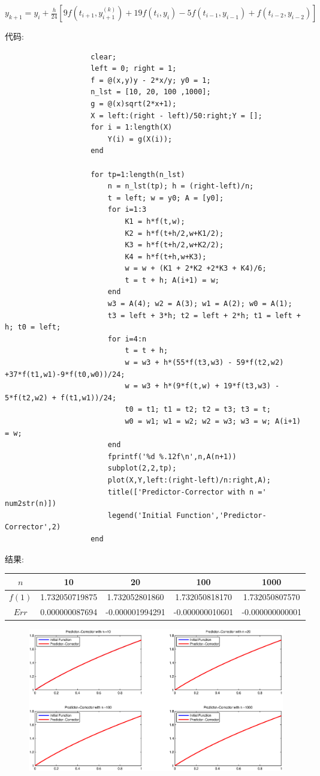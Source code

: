 \documentclass{article}
\begin{document}
\begin{CJK*}{UTF8}{song}
\begin{enumerate}
						$y_{k+1} = y_i + \frac{h}{24}\left[9f\left(t_{i+1},y_{i+1}^{\left(k\right)}\right) + 19f\left(t_i,y_i\right) -5f\left(t_{i-1},y_{i-1}\right) + f\left(t_{i-2},y_{i-2}\right)\right]$
					\end{enumerate}
					代码:
					\begin{lstlisting}
					clear;
					left = 0; right = 1;
					f = @(x,y)y - 2*x/y; y0 = 1;
					n_lst = [10, 20, 100 ,1000];
					g = @(x)sqrt(2*x+1);
					X = left:(right - left)/50:right;Y = [];
					for i = 1:length(X)
						Y(i) = g(X(i));
					end
						
					for tp=1:length(n_lst)
						n = n_lst(tp); h = (right-left)/n;
						t = left; w = y0; A = [y0];
						for i=1:3
							K1 = h*f(t,w);
							K2 = h*f(t+h/2,w+K1/2);
							K3 = h*f(t+h/2,w+K2/2);
							K4 = h*f(t+h,w+K3);
							w = w + (K1 + 2*K2 +2*K3 + K4)/6;
							t = t + h; A(i+1) = w;
						end
						w3 = A(4); w2 = A(3); w1 = A(2); w0 = A(1);
						t3 = left + 3*h; t2 = left + 2*h; t1 = left + h; t0 = left;
						for i=4:n
							t = t + h;
							w = w3 + h*(55*f(t3,w3) - 59*f(t2,w2) +37*f(t1,w1)-9*f(t0,w0))/24;
							w = w3 + h*(9*f(t,w) + 19*f(t3,w3) - 5*f(t2,w2) + f(t1,w1))/24;
							t0 = t1; t1 = t2; t2 = t3; t3 = t;
							w0 = w1; w1 = w2; w2 = w3; w3 = w; A(i+1) = w;
						end
						fprintf('%d %.12f\n',n,A(n+1))
						subplot(2,2,tp);
						plot(X,Y,left:(right-left)/n:right,A);
						title(['Predictor-Corrector with n =' num2str(n)])
						legend('Initial Function','Predictor-Corrector',2)
					end
					\end{lstlisting}
					结果:\\
					\begin{tabular}{|c|c|c|c|c|}
						\hline
						$n$    & 10 & 20 & 100 & 1000\\
						\hline
						$f(1)$ &1.732050719875&1.732052801860&1.732050818170&1.732050807570\\
						\hline
						$Err$& 0.000000087694&-0.000001994291&-0.000000010601&-0.000000000001 \\
						\hline
					\end{tabular}
					\begin{figure}[H]
						\centering
						\includegraphics[width=1.0\textwidth]{../chapter5_1_2.eps}

\end{figure}
\end{CJK*}
\end{document}
